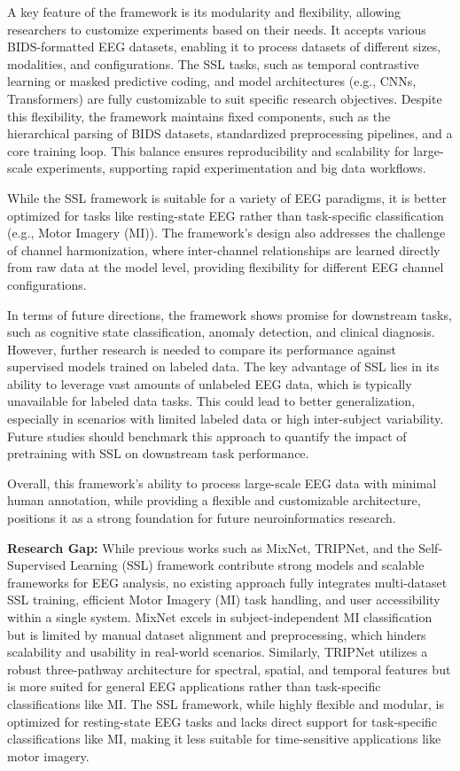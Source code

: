 A key feature of the framework is its modularity and flexibility, allowing researchers to customize experiments based on their needs. It accepts various BIDS-formatted EEG datasets, enabling it to process datasets of different sizes, modalities, and configurations. The SSL tasks, such as temporal contrastive learning or masked predictive coding, and model architectures (e.g., CNNs, Transformers) are fully customizable to suit specific research objectives. Despite this flexibility, the framework maintains fixed components, such as the hierarchical parsing of BIDS datasets, standardized preprocessing pipelines, and a core training loop. This balance ensures reproducibility and scalability for large-scale experiments, supporting rapid experimentation and big data workflows.

While the SSL framework is suitable for a variety of EEG paradigms, it is better optimized for tasks like resting-state EEG rather than task-specific classification (e.g., Motor Imagery (MI)). The framework’s design also addresses the challenge of channel harmonization, where inter-channel relationships are learned directly from raw data at the model level, providing flexibility for different EEG channel configurations.

In terms of future directions, the framework shows promise for downstream tasks, such as cognitive state classification, anomaly detection, and clinical diagnosis. However, further research is needed to compare its performance against supervised models trained on labeled data. The key advantage of SSL lies in its ability to leverage vast amounts of unlabeled EEG data, which is typically unavailable for labeled data tasks. This could lead to better generalization, especially in scenarios with limited labeled data or high inter-subject variability. Future studies should benchmark this approach to quantify the impact of pretraining with SSL on downstream task performance.

Overall, this framework’s ability to process large-scale EEG data with minimal human annotation, while providing a flexible and customizable architecture, positions it as a strong foundation for future neuroinformatics research.

\vspace{0.5em}
\textbf{Research Gap:}
While previous works such as MixNet, TRIPNet, and the Self-Supervised Learning (SSL) framework contribute strong models and scalable frameworks for EEG analysis, no existing approach fully integrates multi-dataset SSL training, efficient Motor Imagery (MI) task handling, and user accessibility within a single system. MixNet excels in subject-independent MI classification but is limited by manual dataset alignment and preprocessing, which hinders scalability and usability in real-world scenarios. Similarly, TRIPNet utilizes a robust three-pathway architecture for spectral, spatial, and temporal features but is more suited for general EEG applications rather than task-specific classifications like MI. The SSL framework, while highly flexible and modular, is optimized for resting-state EEG tasks and lacks direct support for task-specific classifications like MI, making it less suitable for time-sensitive applications like motor imagery.

